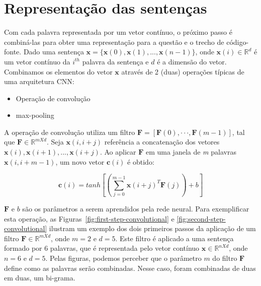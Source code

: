 \section{Representação das sentenças}
\label{sec:representacao-sentenca}

Com cada palavra representada por um vetor contínuo, o próximo passo é combiná-las para obter uma representação para a questão e o trecho de código-fonte. Dado uma sentença $\bm{x} = \{ \bm{x}(0), \bm{x}(1), . . ., \bm{x}(n - 1) \}$, onde $\bm{x}(i) \in \mathbb{R}^{d}$ é um vetor contínuo da $i^{th}$ palavra da sentença e $d$ é a dimensão do vetor. Combinamos os elementos do vetor $\bm{x}$ através de 2 (duas) operações típicas de uma arquitetura CNN:

\begin{itemize}
    \item Operação de convolução
    \item \Gls{max-pooling}
\end{itemize}

A operação de convolução utiliza um filtro $\bm{F}  = [\bm{F}(0),· · ·, \bm{F}(m - 1)]$, tal que $\bm{F} \in \mathbb{R}^{m X d}$. Seja $\bm{x}(i, i + j)$ referência a concatenação dos vetores $\bm{x}(i), \bm{x}(i + 1), . . ., \bm{x}(i + j)$. Ao aplicar $\bm{F}$ em uma janela de \emph{m} palavras $\bm{x}(i, i + m - 1)$, um novo vetor $\bm{c}(i)$ é obtido:

\begin{equation}\label{eq:calc_convolution_ci}
    \bm{c}(i) = tanh \left[\left(\sum_{j=0}^{m - 1} \bm{x}(i + j)^{T}\bm{F}(j)\right) + b\right]
\end{equation}

$\bm{F}$ e $b$ são os parâmetros a serem aprendidos pela rede neural. Para exemplificar esta operação, as Figuras~\ref{fig:first-step-convolutional} e \ref{fig:second-step-convolutional} ilustram um exemplo dos dois primeiros passos da aplicação de um filtro $\bm{F} \in \mathbb{R}^{m X d}$, onde $m = 2$ e $d = 5$. Este filtro é aplicado a uma sentença formado por 6 palavras, que é representada pelo vetor contínuo $\bm{x} \in \mathbb{R}^{n X d}$, onde $n = 6$ e $d = 5$. Pelas figuras, podemos perceber que o parâmetro $m$ do filtro $\bm{F}$ define como as palavras serão combinadas. Nesse caso, foram combinadas de duas em duas, um bi-grama.

